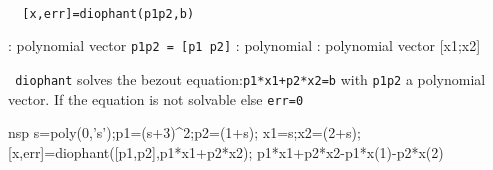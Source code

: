 
\begin{mandesc}
   \\ %
\end{mandesc}
\begin{calling_sequence}
\begin{verbatim}
  [x,err]=diophant(p1p2,b)  
\end{verbatim}
\end{calling_sequence}
\begin{parameters}
  \begin{varlist}
    : polynomial vector \verb!p1p2 = [p1 p2]!
    : polynomial
    : polynomial vector [x1;x2]
  \end{varlist}
\end{parameters}
\begin{mandescription}
  \verb! diophant! solves the bezout equation:\verb!p1*x1+p2*x2=b! with  \verb!p1p2! a polynomial vector.
  If the equation is not solvable
  else \verb!err=0!
\end{mandescription}
\begin{examples}
  \begin{mintednsp}{nsp}
    s=poly(0,'s');p1=(s+3)^2;p2=(1+s);
    x1=s;x2=(2+s);
    [x,err]=diophant([p1,p2],p1*x1+p2*x2);
    p1*x1+p2*x2-p1*x(1)-p2*x(2)
  \end{mintednsp}
\end{examples}

